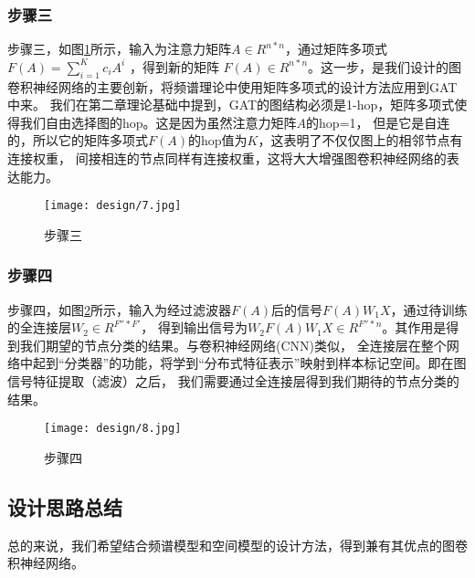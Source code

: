\subsubsection{步骤三}
步骤三，如图\ref{3-7}所示，输入为注意力矩阵$A \in R^{n*n}$，通过矩阵多项式$ F(A)={\sum_{i=1}^{K}c_{i}A^{i}} $ ，得到新的矩阵
$F(A) \in R^{n*n}$。这一步，是我们设计的图卷积神经网络的主要创新，将频谱理论中使用矩阵多项式的设计方法应用到GAT中来。
我们在第二章理论基础中提到，GAT的图结构必须是1-hop，矩阵多项式使得我们自由选择图的hop。这是因为虽然注意力矩阵$A$的hop=1，
但是它是自连的，所以它的矩阵多项式$ F(A) $的hop值为$K$，这表明了不仅仅图上的相邻节点有连接权重，
间接相连的节点同样有连接权重，这将大大增强图卷积神经网络的表达能力。
\begin{figure}[ht]
    \centering
    \texttt{[image: design/7.jpg]}
    \caption{\label{3-7}步骤三}
\end{figure}

\subsubsection{步骤四}
步骤四，如图\ref{3-8}所示，输入为经过滤波器$ F(A) $后的信号$ F(A)W_{1}X $，通过待训练的全连接层$ W_2 \in R^{F''*F'} $，
得到输出信号为$ W_{2}F(A)W_{1}X \in R^{F''*n} $。其作用是得到我们期望的节点分类的结果。与卷积神经网络(CNN)类似，
全连接层在整个网络中起到“分类器”的功能，将学到“分布式特征表示”映射到样本标记空间。即在图信号特征提取（滤波）之后，
我们需要通过全连接层得到我们期待的节点分类的结果。
\begin{figure}[ht]
    \centering
    \texttt{[image: design/8.jpg]}
    \caption{\label{3-8}步骤四}
\end{figure}

\subsection{设计思路总结}
总的来说，我们希望结合频谱模型和空间模型的设计方法，得到兼有其优点的图卷积神经网络。

